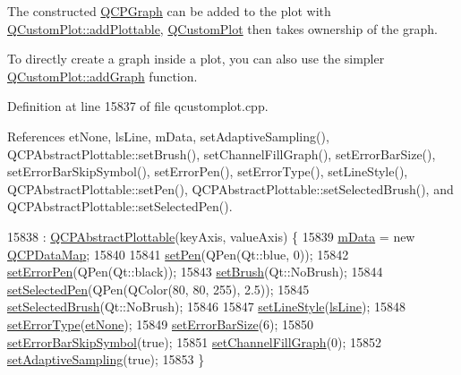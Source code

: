 The constructed \hyperlink{class_q_c_p_graph}{Q\+C\+P\+Graph} can be added to the plot with \hyperlink{class_q_custom_plot_ab7ad9174f701f9c6f64e378df77927a6}{Q\+Custom\+Plot\+::add\+Plottable}, \hyperlink{class_q_custom_plot}{Q\+Custom\+Plot} then takes ownership of the graph.

To directly create a graph inside a plot, you can also use the simpler \hyperlink{class_q_custom_plot_a6fb2873d35a8a8089842d81a70a54167}{Q\+Custom\+Plot\+::add\+Graph} function. 

Definition at line 15837 of file qcustomplot.\+cpp.



References et\+None, ls\+Line, m\+Data, set\+Adaptive\+Sampling(), Q\+C\+P\+Abstract\+Plottable\+::set\+Brush(), set\+Channel\+Fill\+Graph(), set\+Error\+Bar\+Size(), set\+Error\+Bar\+Skip\+Symbol(), set\+Error\+Pen(), set\+Error\+Type(), set\+Line\+Style(), Q\+C\+P\+Abstract\+Plottable\+::set\+Pen(), Q\+C\+P\+Abstract\+Plottable\+::set\+Selected\+Brush(), and Q\+C\+P\+Abstract\+Plottable\+::set\+Selected\+Pen().


\begin{DoxyCode}
15838     : \hyperlink{class_q_c_p_abstract_plottable_af78a036e40db6f53a31abadc5323715a}{QCPAbstractPlottable}(keyAxis, valueAxis) \{
15839   \hyperlink{class_q_c_p_graph_a8457c840f69a0ac49f61d30a509c5d08}{mData} = \textcolor{keyword}{new} \hyperlink{qcustomplot_8h_a84a9c4a4c2216ccfdcb5f3067cda76e3}{QCPDataMap};
15840 
15841   \hyperlink{class_q_c_p_abstract_plottable_ab74b09ae4c0e7e13142fe4b5bf46cac7}{setPen}(QPen(Qt::blue, 0));
15842   \hyperlink{class_q_c_p_graph_abd4c7f81939e10776ea64603a704f22a}{setErrorPen}(QPen(Qt::black));
15843   \hyperlink{class_q_c_p_abstract_plottable_a7a4b92144dca6453a1f0f210e27edc74}{setBrush}(Qt::NoBrush);
15844   \hyperlink{class_q_c_p_abstract_plottable_a6911603cad23ab0469b108224517516f}{setSelectedPen}(QPen(QColor(80, 80, 255), 2.5));
15845   \hyperlink{class_q_c_p_abstract_plottable_ae8c816874089f7a44001e8618e81a9dc}{setSelectedBrush}(Qt::NoBrush);
15846 
15847   \hyperlink{class_q_c_p_graph_a513fecccff5b2a50ce53f665338c60ff}{setLineStyle}(\hyperlink{class_q_c_p_graph_ad60175cd9b5cac937c5ee685c32c0859a3c42a27b15aa3c92d399082fad8b7515}{lsLine});
15848   \hyperlink{class_q_c_p_graph_ac3614d799c3894f2bc646e99c7f73d38}{setErrorType}(\hyperlink{class_q_c_p_graph_ad23b514404bd2cb3216f57c90904d6afaeae745e7cc1766bb8546e35d4b76a711}{etNone});
15849   \hyperlink{class_q_c_p_graph_a10f50c5495ce45ef559ec2066194a335}{setErrorBarSize}(6);
15850   \hyperlink{class_q_c_p_graph_ab1c1ee03d8dd94676a564e5e5f11aac2}{setErrorBarSkipSymbol}(\textcolor{keyword}{true});
15851   \hyperlink{class_q_c_p_graph_a2d03156df1b64037a2e36cfa50351ca3}{setChannelFillGraph}(0);
15852   \hyperlink{class_q_c_p_graph_ab468cd600160f327836aa0644291e64c}{setAdaptiveSampling}(\textcolor{keyword}{true});
15853 \}
\end{DoxyCode}


